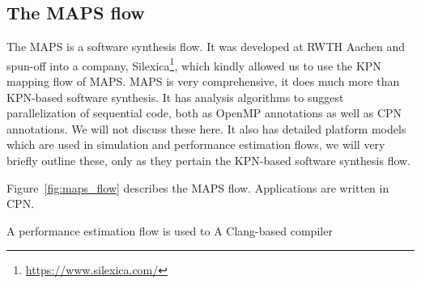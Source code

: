 \subsection{The MAPS flow}

The \acl{MAPS} is a software synthesis flow. It was developed at RWTH Aachen and spun-off into a company, Silexica\footnote{\url{https://www.silexica.com/}}, which kindly allowed us to use the \ac{KPN} mapping flow of \ac{MAPS}.
\ac{MAPS} is very comprehensive, it does much more than \ac{KPN}-based software synthesis.
It has analysis algorithms to suggest parallelization of sequential code, both as OpenMP annotations as well as \ac{CPN} annotations. We will not discuss these here.
It also has detailed platform models which are used in simulation and performance estimation flows, we will very briefly outline these, only as they pertain the \ac{KPN}-based software synthesis flow. 

Figure~\ref{fig:maps_flow} describes the \ac{MAPS} flow. 
Applications are written in \ac{CPN}.

A performance estimation flow is used to 
A Clang-based compiler 